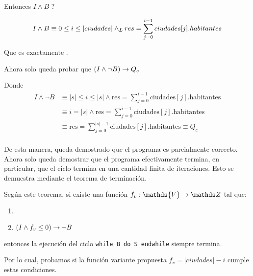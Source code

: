 \documentclass[10pt,a4paper]{article}
\begin{document}
Entonces $\ensuremath{I \land B}$  \implica {}?

\[{I \land B}  \equiv  0 \leq i \leq |ciudades|  \land _L res = \sum_{j=0}^{i-1} ciudades[j].habitantes \]

Que es exactamente .
\bigskip

Ahora solo queda probar que  $(I \land \neg B) \rightarrow Q_c$

Donde
\begin{align*}
	I \land \neg B & \equiv |s| \leq i \leq |s| \land \text{res} = \sum_{j=0}^{i-1} \text{ciudades}[j].\text{habitantes} \\
	               & \equiv i = |s| \land \text{res} = \sum_{j=0}^{i-1} \text{ciudades}[j].\text{habitantes}             \\
	               & \equiv \text{res} = \sum_{j=0}^{|s|-1} \text{ciudades}[j].\text{habitantes} \equiv Q_c              \\
\end{align*}

De esta manera, queda demostrado que el programa es parcialmente correcto. Ahora solo queda demostrar que el programa efectivamente termina, en particular, que el ciclo termina en una cantidad finita de iteraciones. Esto se demuestra mediante el teorema de terminación.
\bigskip

Según este teorema, si existe una función $f_v: \mathds{V} \to \ent$ tal que:

\begin{enumerate}
	\item {}
	\item $(I \land f_v \leq 0) \rightarrow \neg B$
\end{enumerate}

entonces la ejecución del ciclo \lstinline|while B do S endwhile| siempre termina.
\bigskip

Por lo cual, probamos si la función variante propuesta $f_v = |ciudades| - i$ cumple estas condiciones.
\bigskip
\end{document}
